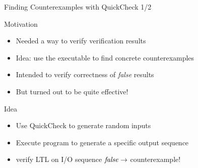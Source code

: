 \begin{frame}{Finding Counterexamples with QuickCheck 1/2}
  \begin{block}{Motivation}
    \begin{itemize}
    \item Needed a way to verify verification results
    \item Idea: use the executable to find concrete counterexamples
    \item Intended to verify correctness of \emph{false} results
    \item But turned out to be quite effective!
    \end{itemize}
  \end{block}

  \begin{block}{Idea}
    \begin{itemize}
    \item Use QuickCheck to generate random inputs
    \item Execute program to generate a specific output sequence
    \item verify LTL on I/O sequence $\mathit{false} \rightarrow$ counterexample!
    \end{itemize}
  \end{block}
\end{frame}

